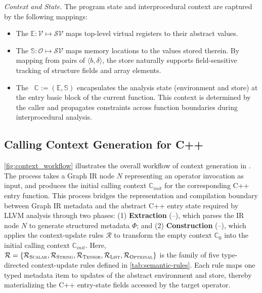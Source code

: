 \textit{Context and State.}
The program state and interprocedural context are captured by the following mappings:
\begin{itemize}
	\item The  $\mathbb{E}: \mathcal{V} \mapsto \mathcal{SV}$ maps top-level virtual registers to their abstract values.
	\item The  $\mathbb{S}: \mathcal{O} \mapsto \mathcal{SV}$ maps memory locations to the values stored therein. By mapping from pairs of $\langle b, \delta \rangle$, the store naturally supports field-sensitive tracking of structure fields and array elements.
	\item The ~$\mathbb{C} := (\mathbb{E}, \mathbb{S})$ encapsulates the analysis state (environment and store) at the entry basic block of the current function. This context is determined by the caller and propagates constraints across function boundaries during interprocedural analysis.
\end{itemize}



\subsection{Calling Context Generation for C++}\label{sec:design:context_construction}

\autoref{fig:context_workflow} illustrates the overall workflow of context generation in \mysys{}.
The process takes a Graph IR node $N$ representing an operator invocation as input, and produces the initial calling context $\mathbb{C}_{init}$ for the corresponding C++ entry function.
This process bridges the representation and compilation boundary between Graph IR metadata and the abstract C++ entry state required by LLVM analysis through two phases:
(1) \textbf{Extraction} (--), which parses the IR node $N$ to generate structured metadata $\Phi$; and
(2) \textbf{Construction} (--), which applies the context-update rules $\mathcal{R}$ to transform the empty context $\mathbb{C}_0$ into the initial calling context $\mathbb{C}_{init}$.
Here, $\mathcal{R} = \{\mathcal{R}_{\textsc{Scalar}}, \mathcal{R}_{\textsc{String}}, \mathcal{R}_{\textsc{Tensor}}, \mathcal{R}_{\textsc{List}}, \mathcal{R}_{\textsc{Optional}}\}$ is the family of five type-directed context-update rules defined in \autoref{tab:semantic-rules}.
Each rule maps one typed metadata item to updates of the abstract environment and store, thereby materializing the C++ entry-state fields accessed by the target operator.

